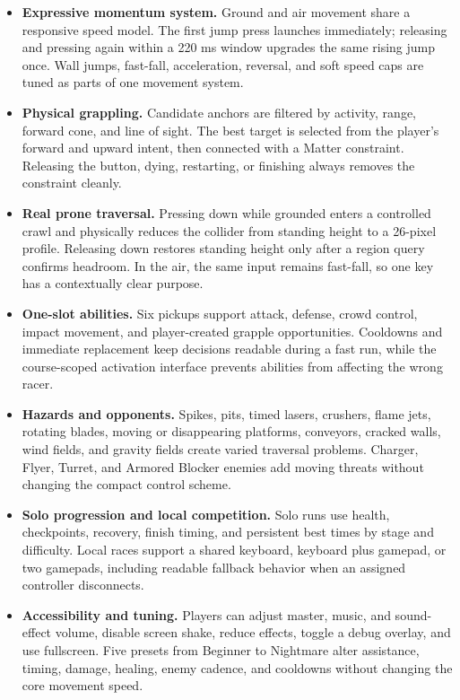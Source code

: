 \documentclass[11pt,letterpaper]{article}
\newcommand{\keyterm}[1]{\textbf{\color{navy}#1}}
\begin{document}
\begin{itemize}
  \item \keyterm{Expressive momentum system.} Ground and air movement share a responsive speed model. The first jump press launches immediately; releasing and pressing again within a 220 ms window upgrades the same rising jump once. Wall jumps, fast-fall, acceleration, reversal, and soft speed caps are tuned as parts of one movement system.

  \item \keyterm{Physical grappling.} Candidate anchors are filtered by activity, range, forward cone, and line of sight. The best target is selected from the player's forward and upward intent, then connected with a Matter constraint. Releasing the button, dying, restarting, or finishing always removes the constraint cleanly.

  \item \keyterm{Real prone traversal.} Pressing down while grounded enters a controlled crawl and physically reduces the collider from standing height to a 26-pixel profile. Releasing down restores standing height only after a region query confirms headroom. In the air, the same input remains fast-fall, so one key has a contextually clear purpose.

  \item \keyterm{One-slot abilities.} Six pickups support attack, defense, crowd control, impact movement, and player-created grapple opportunities. Cooldowns and immediate replacement keep decisions readable during a fast run, while the course-scoped activation interface prevents abilities from affecting the wrong racer.

  \item \keyterm{Hazards and opponents.} Spikes, pits, timed lasers, crushers, flame jets, rotating blades, moving or disappearing platforms, conveyors, cracked walls, wind fields, and gravity fields create varied traversal problems. Charger, Flyer, Turret, and Armored Blocker enemies add moving threats without changing the compact control scheme.

  \item \keyterm{Solo progression and local competition.} Solo runs use health, checkpoints, recovery, finish timing, and persistent best times by stage and difficulty. Local races support a shared keyboard, keyboard plus gamepad, or two gamepads, including readable fallback behavior when an assigned controller disconnects.

  \item \keyterm{Accessibility and tuning.} Players can adjust master, music, and sound-effect volume, disable screen shake, reduce effects, toggle a debug overlay, and use fullscreen. Five presets from Beginner to Nightmare alter assistance, timing, damage, healing, enemy cadence, and cooldowns without changing the core movement speed.
\end{itemize}
\end{document}
